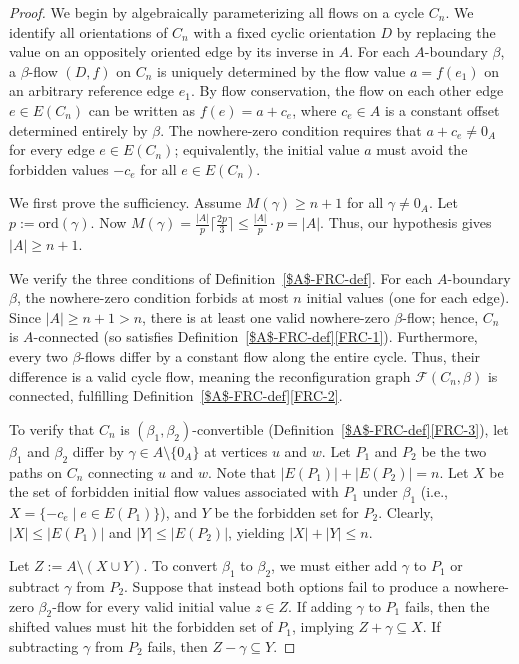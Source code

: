 \documentclass[10pt,a4paper]{amsart}
\newcommand\ord{\mbox{ord}}
\renewcommand\ge\geqslant
\renewcommand\le\leqslant
\renewcommand\ge\geqslant
\begin{document}
\begin{proof}
We begin by algebraically
parameterizing all flows on a cycle $C_n$. We identify all orientations of $C_n$ with a fixed cyclic orientation $D$ by replacing the value on an oppositely oriented edge by its inverse in $A$. For each $A$-boundary $\beta$, a $\beta$-flow $(D, f)$ on $C_n$ is uniquely determined by the flow value $a = f(e_1)$ on an arbitrary reference edge $e_1$. By flow conservation, the flow on each other edge $e \in E(C_n)$ can be written as $f(e) = a + c_e$, where $c_e \in A$ is a constant offset determined entirely by $\beta$.
The nowhere-zero condition requires that $a+c_e \neq 0_A$ for every edge $e\in E(C_n)$; equivalently, the initial value $a$ must avoid the forbidden values $-c_e$ for all $e\in E(C_n)$.

We first prove the sufficiency. Assume $M(\gamma) \ge n + 1$ for all $\gamma \neq 0_A$. 
Let $p:=\ord(\gamma)$.
Now $M(\gamma) = \frac{|A|}{p}\lceil \frac{2p}{3} \rceil \le \frac{|A|}{p} \cdot p = |A|$. Thus, our hypothesis gives $|A| \ge n+1$.

We verify the three conditions of Definition~\ref{$A$-FRC-def}. For each $A$-boundary $\beta$, the nowhere-zero condition forbids at most $n$ initial values (one for each edge). Since $|A| \ge n+1 > n$, there is at least one valid nowhere-zero $\beta$-flow; hence, $C_n$ is $A$-connected (so satisfies Definition~\ref{$A$-FRC-def}\ref{FRC-1}). Furthermore, every two $\beta$-flows differ by a constant flow along the entire cycle. Thus, their difference is a valid cycle flow, meaning the reconfiguration graph $\mathcal{F}(C_n, \beta)$ is connected, fulfilling Definition~\ref{$A$-FRC-def}\ref{FRC-2}.

To verify that $C_n$ is
$(\beta_1, \beta_2)$-convertible (Definition~\ref{$A$-FRC-def}\ref{FRC-3}), let $\beta_1$ and $\beta_2$ differ by $\gamma \in A \setminus \{0_A\}$ at vertices $u$ and $w$. Let $P_1$ and $P_2$ be the two paths on $C_n$ connecting $u$ and $w$. Note that $|E(P_1)| + |E(P_2)| = n$. Let $X$ be the set of forbidden initial flow values associated with $P_1$ under $\beta_1$ (i.e., $X = \{-c_e \mid e \in E(P_1)\}$), and $Y$ be the forbidden set for $P_2$. Clearly, $|X| \le |E(P_1)|$ and $|Y| \le |E(P_2)|$, yielding $|X| + |Y| \le n$. 

Let $Z:=A\setminus (X\cup Y)$.
To convert $\beta_1$ to $\beta_2$, we must either add $\gamma$ to $P_1$ or subtract $\gamma$ from $P_2$. Suppose  that instead both options fail to produce a nowhere-zero $\beta_2$-flow for every valid initial value $z \in Z$. If adding $\gamma$ to $P_1$ fails, then the shifted values must hit the forbidden set of $P_1$, implying $Z + \gamma \subseteq X$. If subtracting $\gamma$ from $P_2$ fails, then $Z - \gamma \subseteq Y$. 


\end{proof}
\end{document}
